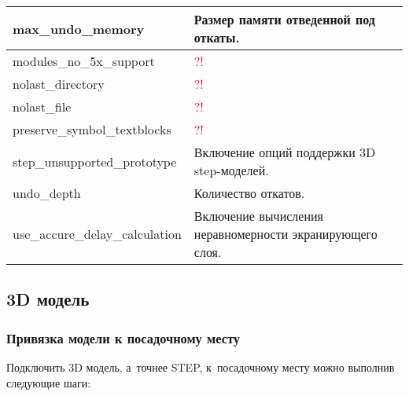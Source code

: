 \begin{tabularx}{\linewidth}{| m{6.5cm} | X |}
	max\_undo\_memory 		& Размер памяти отведенной под откаты.	\\ \hline
	modules\_no\_5x\_support& \textcolor{red}{?!}					\\ \hline
	nolast\_directory 		& \textcolor{red}{?!}					\\ \hline
	nolast\_file 			& \textcolor{red}{?!}					\\ \hline
	preserve\_symbol\_textblocks & \textcolor{red}{?!}				\\ \hline	
	step\_unsupported\_prototype & Включение опций поддержки 3D step-моделей. \\ \hline
	undo\_depth 			& Количество откатов.					\\ \hline
	use\_accure\_delay\_calculation & Включение вычисления неравномерности экранирующего слоя. \\ \hline
\end{tabularx}



\newpage
\subsection{3D модель} \label{ssec:3d_model}



\subsubsection{Привязка модели к посадочному месту} \label{sssec:step_package_mapping}

Подключить 3D модель, а~точнее STEP, к~посадочному месту можно выполнив следующие шаги:

